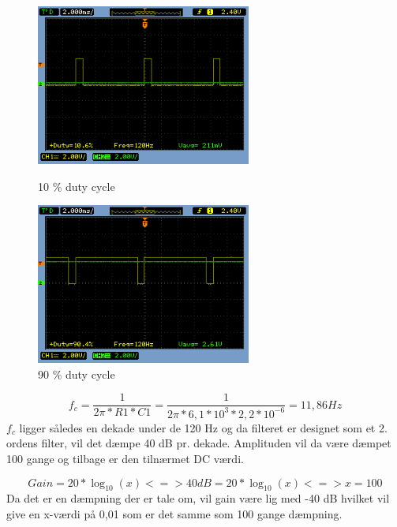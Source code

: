 \begin{figure}[htb]
\begin{minipage}{0.4\textwidth} 
\includegraphics[height=150pt]{filer/design/Billeder/sht_dutycycle10.png}
\caption{\textnormal{10 \% duty cycle}}
\label{lab:sht_dc10}
\end{minipage}
\hspace{0.10\textwidth}
\begin{minipage}{0.4\textwidth}
\includegraphics[height=150pt]{filer/design/Billeder/sht_dutycycle90.png}
\caption{\textnormal{90 \% duty cycle}}
\label{lab:sht_dc90}
\end{minipage}
\hfill
\end{figure}

\begin{equation}
f_c = \frac{1}{2 \pi * R1 * C1} = \frac{1}{2 \pi * 6,1*10^3  * 2,2*10^{-6}} = 11,86 Hz
\end{equation}
$f_c$ ligger således en dekade under de 120 Hz og da filteret er designet som et 2. ordens filter, vil det dæmpe 40 dB pr. dekade. Amplituden vil da være dæmpet 100 gange og tilbage er den tilnærmet DC værdi.

\begin{equation}
Gain = 20 * \log_{10}(x) <=> 40 dB = 20 * \log_ {10}(x) <=> x = 100
\end{equation} 
Da det er en dæmpning der er tale om, vil gain være lig med -40 dB hvilket vil give en x-værdi på 0,01 som er det samme som 100 gange dæmpning.

